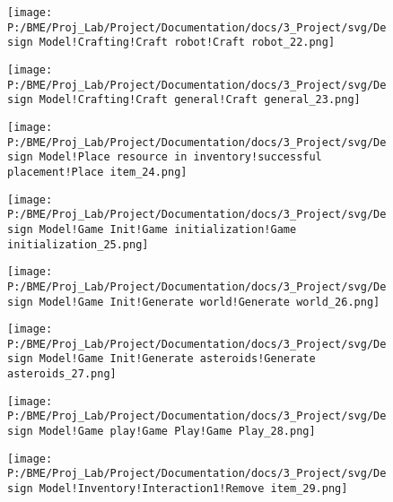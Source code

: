 \begin{figure}[H] 
\centering 
\texttt{[image: P:/BME/Proj\_Lab/Project/Documentation/docs/3\_Project/svg/Design Model!Crafting!Craft robot!Craft robot\_22.png]} 
\caption{} 
\end{figure} 

\begin{figure}[H] 
\centering 
\texttt{[image: P:/BME/Proj\_Lab/Project/Documentation/docs/3\_Project/svg/Design Model!Crafting!Craft general!Craft general\_23.png]} 
\caption{} 
\end{figure} 

\begin{figure}[H] 
\centering 
\texttt{[image: P:/BME/Proj\_Lab/Project/Documentation/docs/3\_Project/svg/Design Model!Place resource in inventory!successful placement!Place item\_24.png]} 
\caption{} 
\end{figure} 

\begin{figure}[H] 
\centering 
\texttt{[image: P:/BME/Proj\_Lab/Project/Documentation/docs/3\_Project/svg/Design Model!Game Init!Game initialization!Game initialization\_25.png]} 
\caption{} 
\end{figure} 

\begin{figure}[H] 
\centering 
\texttt{[image: P:/BME/Proj\_Lab/Project/Documentation/docs/3\_Project/svg/Design Model!Game Init!Generate world!Generate world\_26.png]} 
\caption{} 
\end{figure} 

\begin{figure}[H] 
\centering 
\texttt{[image: P:/BME/Proj\_Lab/Project/Documentation/docs/3\_Project/svg/Design Model!Game Init!Generate asteroids!Generate asteroids\_27.png]} 
\caption{} 
\end{figure} 

\begin{figure}[H] 
\centering 
\texttt{[image: P:/BME/Proj\_Lab/Project/Documentation/docs/3\_Project/svg/Design Model!Game play!Game Play!Game Play\_28.png]} 
\caption{} 
\end{figure} 

\begin{figure}[H] 
\centering 
\texttt{[image: P:/BME/Proj\_Lab/Project/Documentation/docs/3\_Project/svg/Design Model!Inventory!Interaction1!Remove item\_29.png]} 
\caption{} 
\end{figure} 

